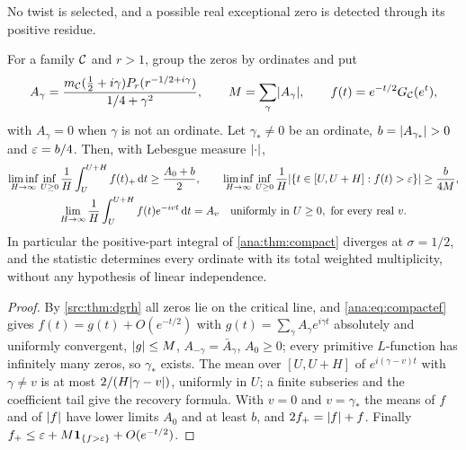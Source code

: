 No twist is selected, and a possible real exceptional zero is detected through its positive
residue.

\begin{theorem}\label{ana:thm:excursions}
For a family $\mathcal{C}$ and $r>1$, group the zeros by ordinates and put
\[
 A_\gamma=\frac{m_{\mathcal{C}}(\frac12+i\gamma)P_r(r^{-1/2+i\gamma})}{1/4+\gamma^2},\qquad
 M=\sum_\gamma\lvert A_\gamma\rvert,\qquad f(t)=e^{-t/2}G_{\mathcal{C}}(e^t),
\]
with $A_\gamma=0$ when $\gamma$ is not an ordinate. Let $\gamma_*\ne0$ be an ordinate,
$b=\lvert A_{\gamma_*}\rvert>0$ and $\varepsilon=b/4$. Then, with Lebesgue measure $\lvert\cdot\rvert$,
\begin{gather*}
 \liminf_{H\to\infty}\inf_{U\ge0}\frac1H\int_U^{U+H}f(t)_+\,\mathrm{d} t\ge\frac{A_0+b}2,\qquad
 \liminf_{H\to\infty}\inf_{U\ge0}\frac1H\lvert\{t\in[U,U+H]:f(t)>\varepsilon\}\rvert\ge\frac b{4M},\\
 \lim_{H\to\infty}\frac1H\int_U^{U+H}f(t)e^{-ivt}\,\mathrm{d} t=A_v\quad\text{uniformly in }U\ge0,
 \text{ for every real }v.
\end{gather*}
In particular the positive-part integral of \cref{ana:thm:compact} diverges at $\sigma=1/2$,
and the statistic determines every ordinate with its total weighted multiplicity, without any
hypothesis of linear independence.
\end{theorem}

\begin{proof}
By \cref{src:thm:dgrh} all zeros lie on the critical line, and \eqref{ana:eq:compactef} gives
$f(t)=g(t)+O(e^{-t/2})$ with $g(t)=\sum_\gamma A_\gamma e^{i\gamma t}$ absolutely and uniformly
convergent, $\lvert g\rvert\le M$, $A_{-\gamma}=\bar A_\gamma$, $A_0\ge0$; every primitive
$L$-function has infinitely many zeros, so $\gamma_*$ exists. The mean over $[U,U+H]$ of
$e^{i(\gamma-v)t}$ with $\gamma\ne v$ is at most $2/(H\lvert\gamma-v\rvert)$, uniformly in $U$; a
finite subseries and the coefficient tail give the recovery formula. With $v=0$ and
$v=\gamma_*$ the means of $f$ and of $\lvert f\rvert$ have lower limits $A_0$ and at least $b$, and
$2f_+=\lvert f\rvert+f$. Finally $f_+\le\varepsilon+M\mathbf{1}_{\{f>\varepsilon\}}+O(e^{-t/2})$.
\end{proof}

